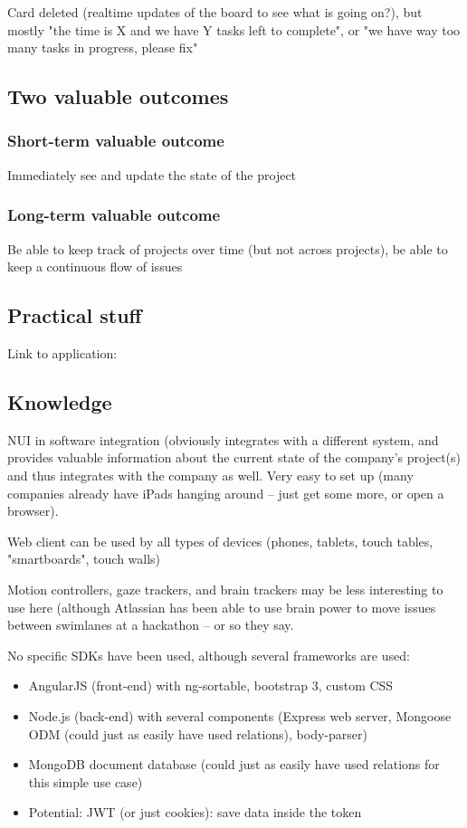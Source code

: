 Card deleted (realtime updates of the board to see what is going on?), but mostly "the time is X and we have Y tasks left to complete", or "we have way too many tasks in progress, please fix"

\subsection{Two valuable outcomes}

\subsubsection{Short-term valuable outcome}

Immediately see and update the state of the project

\subsubsection{Long-term valuable outcome}

Be able to keep track of projects over time (but not across projects), be able to keep a continuous flow of issues %

\subsection{Practical stuff}

Link to application: %

\subsection{Knowledge}

NUI in software integration (obviously integrates with a different system, and provides valuable information about the current state of the company's project(s) and thus integrates with the company as well. Very easy to set up (many companies already have iPads hanging around – just get some more, or open a browser).

Web client can be used by all types of devices (phones, tablets, touch tables, "smartboards", touch walls)

Motion controllers, gaze trackers, and brain trackers may be less interesting to use here (although Atlassian has been able to use brain power to move issues between swimlanes at a hackathon – or so they say.

No specific SDKs have been used, although several frameworks are used:
\begin{itemize}
  \item AngularJS (front-end) with ng-sortable, bootstrap 3, custom CSS
  \item Node.js (back-end) with several components (Express web server, Mongoose ODM (could just as easily have used relations), body-parser)
  \item MongoDB document database (could just as easily have used relations for this simple use case)
  \item Potential: JWT (or just cookies): save data inside the token
\end{itemize}

